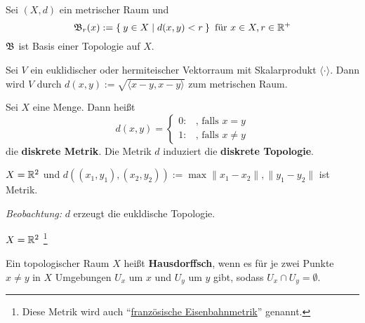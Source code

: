 \begin{bemerkung}
    Sei $(X, d)$ ein metrischer Raum und
    \[\mathfrak{B}_r(x) := \Set{y \in X | d(x,y) < r} \text{ für } x \in X, r \in \mathbb{R}^+\]
    $\mathfrak{B}$ ist Basis einer Topologie auf $X$.
\end{bemerkung}

\begin{beispiel}
    Sei $V$ ein euklidischer oder hermiteischer Vektorraum mit Skalarprodukt
    $\langle \cdot \rangle$.
    Dann wird $V$ durch $d(x,y) := \sqrt{\langle x-y, x-y \rangle}$ zum metrischen Raum.
\end{beispiel}

\begin{beispiel}  
    Sei $X$ eine Menge. Dann heißt
    \[d(x,y) = \begin{cases}
    0: & \text{, falls } x=y\\
    1: & \text{, falls } x \neq y
    \end{cases}\]
    die \textbf{diskrete Metrik}. Die Metrik $d$ induziert die 
    \textbf{diskrete Topologie}.
\end{beispiel}

\begin{beispiel}
    $X = \mathbb{R}^2$ und $d\left ((x_1, y_1), (x_2, y_2)\right ) := \max{\|x_1 - x_2\|, \|y_1 - y_2\|}$
    ist Metrik.


    \emph{Beobachtung:} $d$ erzeugt die eukldische Topologie.

\end{beispiel}

\begin{beispiel} 
    $X = \mathbb{R}^2$ \footnote{Diese Metrik wird auch \enquote{\href{https://de.wikipedia.org/wiki/Franz\%C3\%B6sische_Eisenbahnmetrik}{französische Eisenbahnmetrik}} genannt.}

    
\end{beispiel}

\begin{definition} 
    Ein topologischer Raum $X$ heißt \textbf{Hausdorffsch}, wenn es
    für je zwei Punkte $x \neq y$ in $X$ Umgebungen $U_x$ um $x$
    und $U_y$ um $y$ gibt, sodass $U_x \cap U_y = \emptyset$.
\end{definition}

